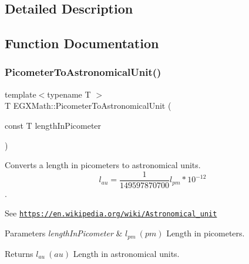 \subsection{Detailed Description}


\subsection{Function Documentation}
\mbox{\label{group___e_g_x_math-_conversions-_length_conversions-_picometer-_astronomical_gae051f7eb0eb85b99c614183acc6b8ea6}} 
\subsubsection{\texorpdfstring{Picometer\+To\+Astronomical\+Unit()}{PicometerToAstronomicalUnit()}}
{\footnotesize\ttfamily template$<$typename T $>$ \\
T E\+G\+X\+Math\+::\+Picometer\+To\+Astronomical\+Unit (\begin{DoxyParamCaption}\item[{const T}]{length\+In\+Picometer }\end{DoxyParamCaption})}



Converts a length in picometers to astronomical units. \[ l_{au}= \frac{1}{149597870700} l_{pm} * 10^{-12} \]. 

See \href{https://en.wikipedia.org/wiki/Astronomical_unit}{\tt https\+://en.\+wikipedia.\+org/wiki/\+Astronomical\+\_\+unit} 
\begin{DoxyParams}{Parameters}
{\em length\+In\+Picometer} & $ l_{pm}\ (pm)$ Length in picometers. \\
\hline
\end{DoxyParams}
\begin{DoxyReturn}{Returns}
$ l_{au}\ (au)$ Length in astronomical units. 
\end{DoxyReturn}
\mbox{\label{group___e_g_x_math-_conversions-_length_conversions-_picometer-_astronomical_ga4d8abbec265ae9e35ac109356db5b89a}} 
